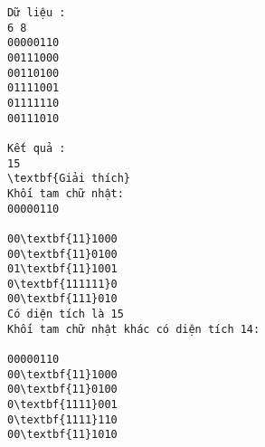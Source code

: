 \begin{verbatim}
Dữ liệu :
6 8
00000110
00111000
00110100
01111001
01111110
00111010

Kết quả :
15
\textbf{Giải thích}
Khối tam chữ nhật:
00000110

00\textbf{11}1000
00\textbf{11}0100
01\textbf{11}1001
0\textbf{111111}0
00\textbf{111}010
Có diện tích là 15
Khối tam chữ nhật khác có diện tích 14:

00000110
00\textbf{11}1000
00\textbf{11}0100
0\textbf{1111}001
0\textbf{1111}110
00\textbf{11}1010
\end{verbatim}